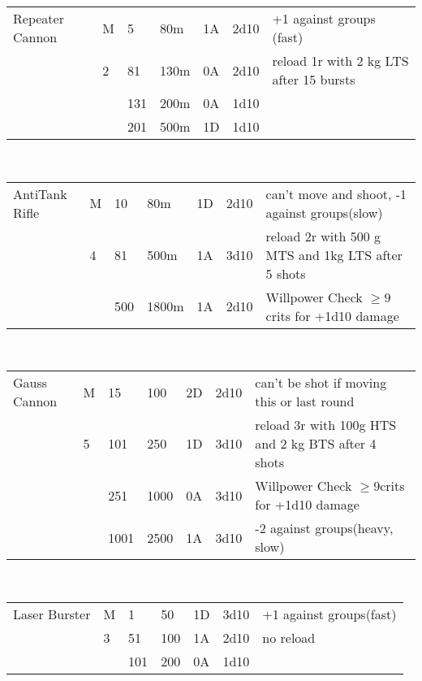 \documentclass{article}
\begin{document}
 \begin{tabularx}{\textwidth}{p{2cm}p{0.4cm}p{0.5cm}@{ - }p{0.6cm}p{0.6cm}p{0.9cm}p{8cm}}\\\hline
Repeater Cannon & M &  5 & 80m      & 1A   & 2d10& +1 against groups (fast)\\
        &   2    & 81 & 130m         & 0A   & 2d10 & reload 1r with 2 kg LTS after 15 bursts\\
        &       & 131 & 200m        & 0A   & 1d10\\
        &       & 201 & 500m        & 1D   & 1d10\\            \end{tabularx}\\ 
 \begin{tabularx}{\textwidth}{p{2cm}p{0.4cm}p{0.5cm}@{ - }p{0.6cm}p{0.6cm}p{0.9cm}p{8cm}}\\\hline
AntiTank Rifle & M  & 10 & 80m       & 1D   & 2d10 & can't move and shoot, -1 against groups(slow)\\
        &   4   & 81 & 500m         & 1A   & 3d10 & reload 2r with 500 g MTS and 1kg LTS after 5 shots\\
        &       & 500 & 1800m       & 1A   & 2d10 & Willpower Check \(\geq9\)crits for +1d10 damage\\             \end{tabularx}\\ 
 \begin{tabularx}{\textwidth}{p{2cm}p{0.3cm}p{0.6cm}@{ - }p{0.6cm}p{0.6cm}p{0.9cm}p{8cm}}\\\hline
Gauss Cannon  & M   & 15  & 100      & 2D   & 2d10 & can't be shot if moving this or last round\\
        &   5    & 101  & 250         & 1D   & 3d10& reload 3r with 100g HTS and 2 kg BTS after 4 shots\\
        &       & 251 & 1000         & 0A   & 3d10& Willpower Check \(\geq9\)crits for +1d10 damage\\
        &       & 1001 & 2500        & 1A   & 3d10&  -2 against groups(heavy, slow)\\            \end{tabularx}\\ 
 \begin{tabularx}{\textwidth}{p{2cm}p{0.4cm}p{0.5cm}@{ - }p{0.6cm}p{0.6cm}p{0.9cm}p{8cm}}\\\hline
Laser Burster&M   & 1  & 50          & 1D   & 3d10 & +1 against groups(fast)\\
        &   3    & 51  & 100         & 1A   & 2d10 & no reload\\
        &       & 101 & 200          & 0A   & 1d10\\            \end{tabularx}\\ 
\end{document}
